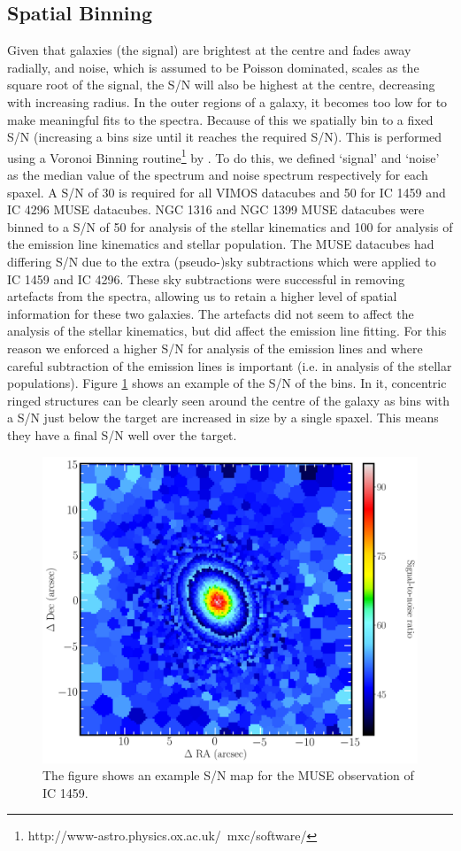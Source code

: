 	\subsection{Spatial Binning}
		\label{subsec:Binning}
		Given that galaxies (the signal) are brightest at the centre and fades away radially, and noise, which is assumed to be Poisson dominated, scales as the square root of the signal, the S/N will also be highest at the centre, decreasing with increasing radius. In the outer regions of a galaxy, it becomes too low for to make meaningful fits to the spectra. Because of this we spatially bin to a fixed S/N (increasing a bins size until it reaches the required S/N). This is performed using a Voronoi Binning routine\footnote{http://www-astro.physics.ox.ac.uk/~mxc/software/} by \citet{Cappellari2003}. To do this, we defined `signal' and `noise' as the median value of the spectrum and noise spectrum respectively for each spaxel. A S/N of 30 is required for all VIMOS datacubes and 50 for IC 1459 and IC 4296 MUSE datacubes. NGC 1316 and NGC 1399 MUSE datacubes were binned to a S/N of 50 for analysis of the stellar kinematics and 100 for analysis of the emission line kinematics and stellar population. The MUSE datacubes had differing S/N due to the extra (pseudo-)sky subtractions which were applied to IC 1459 and IC 4296. These sky subtractions were successful in removing artefacts from the spectra, allowing us to retain a higher level of spatial information for these two galaxies. The artefacts did not seem to affect the analysis of the stellar kinematics, but did affect the emission line fitting. For this reason we enforced a higher S/N for analysis of the emission lines and where careful subtraction of the emission lines is important (i.e. in analysis of the stellar populations). Figure \ref{fig:egSNR} shows an example of the S/N of the bins. In it, concentric ringed structures can be clearly seen around the centre of the galaxy as bins with a S/N just below the target are increased in size by a single spaxel. This means they have a final S/N well over the target.

		\begin{figure}
			\centering
			\includegraphics[width=.6\textwidth]{chapter2/egSNR.png}
			\caption[Example S/N map]{The figure shows an example S/N map for the MUSE observation of IC 1459.}
			\label{fig:egSNR}
		\end{figure}

